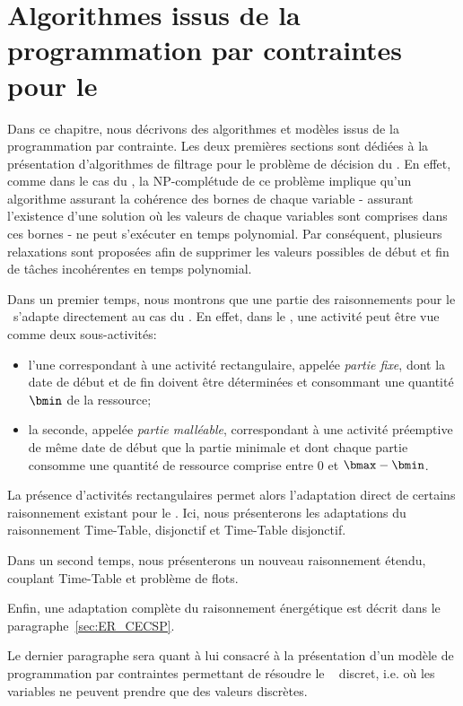 \chapter{Algorithmes issus de la programmation par contraintes pour le
\CECSP}
\label{sec:PPC_CECSP}
Dans ce chapitre, nous décrivons des algorithmes et modèles issus de
la programmation par contrainte. Les deux premières sections sont
dédiées à la présentation d'algorithmes de filtrage pour le problème
de décision du \CECSP. En effet, comme dans le cas du \CUSP, la
NP-complétude de ce problème implique qu'un algorithme assurant la
cohérence des bornes de chaque variable - assurant l'existence d'une
solution où les valeurs de chaque variables sont comprises dans ces
bornes - ne peut s'exécuter en temps polynomial. Par conséquent,
plusieurs relaxations sont proposées afin de supprimer les valeurs
possibles de début et fin de tâches incohérentes en temps polynomial.

Dans un premier temps, nous montrons que une partie des raisonnements
pour le \CUSP~s'adapte directement au cas du \CECSP. En effet, dans le
\CECSP, une activité peut être vue comme deux sous-activités: 
\begin{itemize}
\item l'une correspondant à une activité rectangulaire, appelée {\it
partie fixe}, dont la date de début et de fin doivent être
déterminées et consommant une quantité $\bmin$ de la ressource;
\item la seconde, appelée {\it partie malléable}, correspondant à une
activité préemptive de même date de début que la partie minimale et
dont chaque partie consomme une quantité de ressource comprise entre
$0$ et $\bmax-\bmin$.
\end{itemize}
La présence d'activités rectangulaires permet alors l'adaptation direct
de certains raisonnement existant pour le \CUSP. Ici, nous
présenterons les adaptations du raisonnement Time-Table, disjonctif et
Time-Table disjonctif. 

Dans un second temps, nous présenterons un nouveau raisonnement
étendu, couplant Time-Table et problème de flots. 

Enfin, une adaptation complète du raisonnement énergétique est décrit
dans le paragraphe~\ref{sec:ER_CECSP}.

Le dernier paragraphe sera quant à lui consacré à la présentation d'un
modèle de programmation par contraintes permettant de résoudre le
\CECSP~ discret, i.e. où les variables ne peuvent prendre que des
valeurs discrètes.





